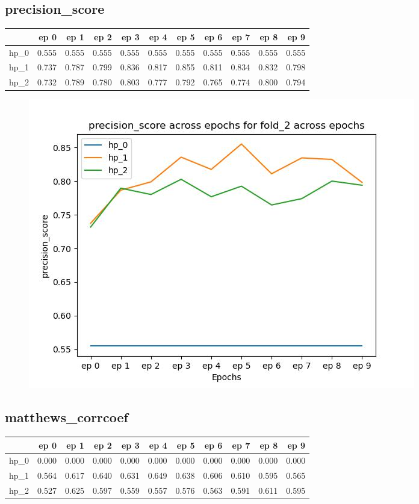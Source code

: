 \documentclass{article}
\begin{document}
\subsection{precision\_score}
\begin{tabular}{lrrrrrrrrrr}
\toprule
{} &   ep 0 &   ep 1 &   ep 2 &   ep 3 &   ep 4 &   ep 5 &   ep 6 &   ep 7 &   ep 8 &   ep 9 \\
\midrule
hp\_0 &  0.555 &  0.555 &  0.555 &  0.555 &  0.555 &  0.555 &  0.555 &  0.555 &  0.555 &  0.555 \\
hp\_1 &  0.737 &  0.787 &  0.799 &  0.836 &  0.817 &  0.855 &  0.811 &  0.834 &  0.832 &  0.798 \\
hp\_2 &  0.732 &  0.789 &  0.780 &  0.803 &  0.777 &  0.792 &  0.765 &  0.774 &  0.800 &  0.794 \\
\bottomrule
\end{tabular}

\begin{figure}[H]
\includegraphics[scale = 0.75]{fold_2/precision_score}
\end{figure}
\subsection{matthews\_corrcoef}
\begin{tabular}{lrrrrrrrrrr}
\toprule
{} &   ep 0 &   ep 1 &   ep 2 &   ep 3 &   ep 4 &   ep 5 &   ep 6 &   ep 7 &   ep 8 &   ep 9 \\
\midrule
hp\_0 &  0.000 &  0.000 &  0.000 &  0.000 &  0.000 &  0.000 &  0.000 &  0.000 &  0.000 &  0.000 \\
hp\_1 &  0.564 &  0.617 &  0.640 &  0.631 &  0.649 &  0.638 &  0.606 &  0.610 &  0.595 &  0.565 \\
hp\_2 &  0.527 &  0.625 &  0.597 &  0.559 &  0.557 &  0.576 &  0.563 &  0.591 &  0.611 &  0.595 \\
\bottomrule
\end{tabular}
\end{document}
